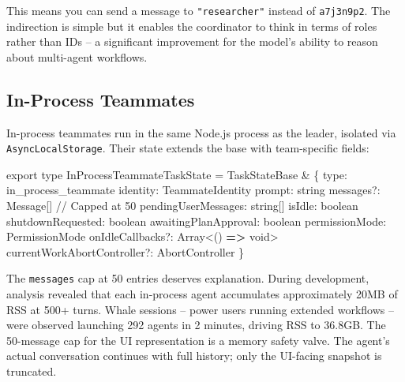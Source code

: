 \documentclass[
  english,
  11pt,
  letterpaper,
]{book}
\newenvironment{Shaded}{\begin{snugshade}}{\end{snugshade}}
\newcommand{\BuiltInTok}[1]{\textcolor[rgb]{0.00,0.23,0.31}{#1}}
\newcommand{\CommentTok}[1]{\textcolor[rgb]{0.37,0.37,0.37}{#1}}
\newcommand{\DataTypeTok}[1]{\textcolor[rgb]{0.68,0.00,0.00}{#1}}
\newcommand{\ImportTok}[1]{\textcolor[rgb]{0.00,0.46,0.62}{#1}}
\newcommand{\KeywordTok}[1]{\textcolor[rgb]{0.00,0.23,0.31}{\textbf{#1}}}
\newcommand{\NormalTok}[1]{\textcolor[rgb]{0.00,0.23,0.31}{#1}}
\newcommand{\OperatorTok}[1]{\textcolor[rgb]{0.37,0.37,0.37}{#1}}
\newcommand{\StringTok}[1]{\textcolor[rgb]{0.13,0.47,0.30}{#1}}
\begin{document}
This means you can send a message to \texttt{"researcher"} instead of
\texttt{a7j3n9p2}. The indirection is simple but it enables the
coordinator to think in terms of roles rather than IDs -- a significant
improvement for the model's ability to reason about multi-agent
workflows.

\subsection{In-Process Teammates}\label{in-process-teammates}

In-process teammates run in the same Node.js process as the leader,
isolated via \texttt{AsyncLocalStorage}. Their state extends the base
with team-specific fields:

\begin{Shaded}
\begin{Highlighting}[]
\ImportTok{export type}\NormalTok{ InProcessTeammateTaskState }\OperatorTok{=}\NormalTok{ TaskStateBase }\OperatorTok{\&}\NormalTok{ \{}
\NormalTok{  type}\OperatorTok{:} \StringTok{\textquotesingle{}in\_process\_teammate\textquotesingle{}}
\NormalTok{  identity}\OperatorTok{:}\NormalTok{ TeammateIdentity}
\NormalTok{  prompt}\OperatorTok{:} \DataTypeTok{string}
\NormalTok{  messages}\OperatorTok{?:}\NormalTok{ Message[]                  }\CommentTok{// Capped at 50}
\NormalTok{  pendingUserMessages}\OperatorTok{:} \DataTypeTok{string}\NormalTok{[]}
\NormalTok{  isIdle}\OperatorTok{:} \DataTypeTok{boolean}
\NormalTok{  shutdownRequested}\OperatorTok{:} \DataTypeTok{boolean}
\NormalTok{  awaitingPlanApproval}\OperatorTok{:} \DataTypeTok{boolean}
\NormalTok{  permissionMode}\OperatorTok{:}\NormalTok{ PermissionMode}
\NormalTok{  onIdleCallbacks}\OperatorTok{?:} \BuiltInTok{Array}\OperatorTok{\textless{}}\NormalTok{() }\KeywordTok{=\textgreater{}} \DataTypeTok{void}\OperatorTok{\textgreater{}}
\NormalTok{  currentWorkAbortController}\OperatorTok{?:}\NormalTok{ AbortController}
\NormalTok{\}}
\end{Highlighting}
\end{Shaded}

The \texttt{messages} cap at 50 entries deserves explanation. During
development, analysis revealed that each in-process agent accumulates
approximately 20MB of RSS at 500+ turns. Whale sessions -- power users
running extended workflows -- were observed launching 292 agents in 2
minutes, driving RSS to 36.8GB. The 50-message cap for the UI
representation is a memory safety valve. The agent's actual conversation
continues with full history; only the UI-facing snapshot is truncated.
\end{document}
